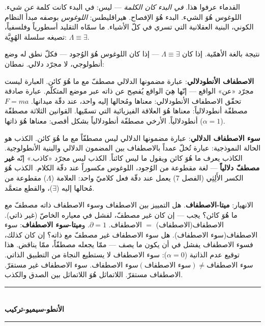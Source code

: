 \documentclass[10pt, openany, oneside]{book}
\renewcommand{\normalsize}{\fontsize{10}{13}\selectfont}
\begin{document}
القدماء عرفوا هذا. \textit{في البدء كان الكلمة} --- ليس: في البدء كانت كلمة \textit{عن} شيء. اللوغوس هُوَ الشيء. البدء هُوَ الإفصاح. هيراقليطس: \textit{اللوغوس} بوصفه مبدأ النظام الكوني، البنية العقلانية التي تسري في كلّ الأشياء. ما سمّاه التقليد أسطورياً وفلسفياً، تصيغه سلسلة الهُوِيَّة: $\Lambda \equiv \exists$.

نتيجة بالغة الأهمّية. إذا كان $\Lambda \equiv \exists$ --- إذا كان اللوغوس هُوَ الوُجود --- فكلّ نطق له وضع أنطولوجي، لا مجرّد دلالي. نمطان:

\textbf{الاصطفاف الأنطودلالي}: عبارة مضمونها الدلالي مصطفّ مع ما هُوَ كائن. العبارة ليست مجرّد «عن» الواقع --- إنّها هِيَ الواقع يُفصِح عن ذاته عبر موضع المتكلّم. عبارة صادقة تحقّق الاصطفاف الأنطودلالي: معناها ومُحالها إليه واحد، عند دقّة ميدانها. $F = ma$ مصطفّة أنطودلالياً: معناها هُوَ العلاقة الفيزيائية التي تسمّيها. القوانين الثلاثة مصطفّة أنطودلالياً. الأرخي مصطفّة أنطودلالياً بشكل أقصى: معناها هُوَ ذاتها ($\alpha = 1$).

\textbf{سوء الاصطفاف الدلالي}: عبارة مضمونها الدلالي ليس مصطفّاً مع ما هُوَ كائن. الكذب هو الحالة النموذجية: عبارة تُخلّ عمداً بالاصطفاف بين المضمون الدلالي والبنية الأنطولوجية. الكاذب يعرف ما هُوَ كائن ويقول ما ليس كائناً. الكذب ليس مجرّد «كاذب.» إنّه \textbf{غير مصطفّ دلالياً} --- لغة مقطوعة من الوُجود، اللوغوس مكسوراً عند دقّة الكلام. الكذب هُوَ الكسر الأَلِثِي (الفصل 7) يعمل عند دقّة فعل كلاميّ واحد: العلامة ($\Lambda$) مقطوعة من مُحالها إليه ($\exists$)، والقطع متعمَّد.

الانهيار: \textbf{ميتا-الاصطفاف}. هل التمييز بين الاصطفاف وسوء الاصطفاف ذاته مصطفّ مع ما هُوَ كائن؟ يجب --- إن كان غير مصطفّ، لفشل في معياره الخاصّ (غير ذاتي). الاصطفاف(الاصطفاف) $=$ الاصطفاف. $\partial = 1$. و\textbf{ميتا-سوء الاصطفاف}: سوء الاصطفاف(سوء الاصطفاف). هل سوء الاصطفاف غير مصطفّ مع ذاته؟ إن كان كذلك، فسوء الاصطفاف يفشل في أن يكون ما يصف --- ممّا يجعله مصطفّاً، ممّا يناقض. هذا توقيع عدم الذاتية ($\alpha = 0$): سوء الاصطفاف لا يستطيع النجاة من التطبيق الذاتي. $\text{سوء الاصطفاف}(\text{سوء الاصطفاف}) \neq \text{سوء الاصطفاف}$. سوء الاصطفاف غير مستقرّ. الاصطفاف مستقرّ. اللاتماثل هُوَ اللاتماثل بين الصدق والكذب.

\vspace{1.5em}


\begin{center}
    \rule{0.3\textwidth}{0.4pt}\\[0.5em]
    {\normalsize\bfseries الأنطو-سيميو-تركيب}\\[0.3em]
    \rule{0.3\textwidth}{0.4pt}
\end{center}
\end{document}
